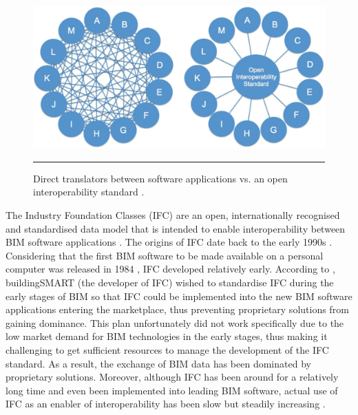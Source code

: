 \begin{figure}[htbp]
	\centering
	\includegraphics[width=\textwidth]{figures/Interoperability.png}
	\rule{\textwidth}{0.5pt} %
	\caption[Direct translators between software applications vs. an open interoperability standard]{Direct translators between software applications vs. an open interoperability standard \citep{Laakso2012}.}
	\label{io}
\end{figure}

The Industry Foundation Classes (IFC) are an open, internationally recognised and standardised data model that is intended to enable interoperability between BIM software applications \citep{Laakso2012}.
The origins of IFC date back to the early 1990s \citep{Laakso2012}.
Considering that the first BIM software to be made available on a personal computer was released in 1984 \citep{Quirk2012}, IFC developed relatively early.
According to \cite{Laakso2012}, buildingSMART (the developer of IFC) wished to standardise IFC during the early stages of BIM so that IFC could be implemented into the new BIM software applications entering the marketplace, thus preventing proprietary solutions from gaining dominance.
This plan unfortunately did not work specifically due to the low market demand for BIM technologies in the early stages, thus making it challenging to get sufficient resources to manage the development of the IFC standard.
As a result, the exchange of BIM data has been dominated by proprietary solutions.
Moreover, although IFC has been around for a relatively long time and even been implemented into leading BIM software, actual use of IFC as an enabler of interoperability has been slow but steadily increasing \citep{Laakso2012}.
